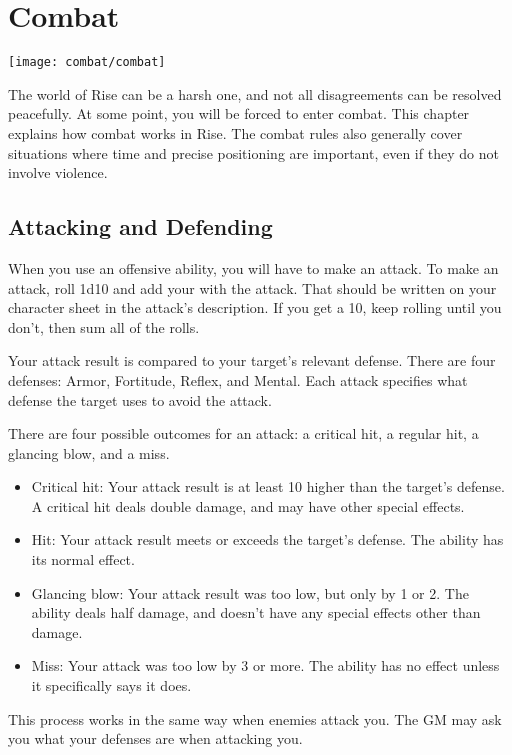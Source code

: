 \chapter{Combat}\label{Combat}
\texttt{[image: combat/combat]}

The world of Rise can be a harsh one, and not all disagreements can be resolved peacefully.
At some point, you will be forced to enter combat.
This chapter explains how combat works in Rise.
The combat rules also generally cover situations where time and precise positioning are important, even if they do not involve violence.

\section{Attacking and Defending}
  When you use an offensive ability, you will have to make an attack.
  To make an attack, roll 1d10 and add your  with the attack.
  That should be written on your character sheet in the attack's description.
  If you get a 10, keep rolling until you don't, then sum all of the rolls.

  Your attack result is compared to your target's relevant defense.
  There are four defenses: Armor, Fortitude, Reflex, and Mental.
  Each attack specifies what defense the target uses to avoid the attack.

  There are four possible outcomes for an attack: a critical hit, a regular hit, a glancing blow, and a miss.
  \begin{itemize}
    \item Critical hit: Your attack result is at least 10 higher than the target's defense.
      A critical hit deals double damage, and may have other special effects.
    \item Hit: Your attack result meets or exceeds the target's defense.
      The ability has its normal effect.
    \item Glancing blow: Your attack result was too low, but only by 1 or 2.
      The ability deals half damage, and doesn't have any special effects other than damage.
    \item Miss: Your attack was too low by 3 or more.
      The ability has no effect unless it specifically says it does.
  \end{itemize}

  This process works in the same way when enemies attack you.
  The GM may ask you what your defenses are when attacking you.

